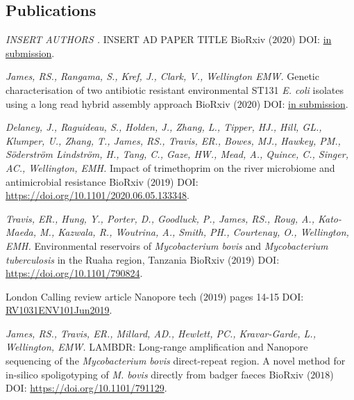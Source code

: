 \documentclass[hidelinks]{james-cv} %
\begin{document}
\subsection{Publications}
\hspace{-22.4\parskip}\begin{reflist}
\ent
\textit{INSERT AUTHORS . } {INSERT AD PAPER TITLE} {BioRxiv \color{gray}($2020$) \bodyfontsc DOI: \thinfont\color{blue}\href{https://www.biorxiv.org/}{in submission}.}

\ent
\textit{James, RS., Rangama, S., Kref, J., Clark, V., Wellington EMW. } {Genetic characterisation of two antibiotic resistant environmental ST131 \textit {E. coli} \textrm isolates using a long read hybrid assembly approach } {BioRxiv \color{gray}($2020$) \bodyfontsc DOI: \thinfont\color{blue}\href{https://www.biorxiv.org/}{in submission}.}

\ent
\textit{Delaney, J., Raguideau, S., Holden, J., Zhang, L., Tipper, HJ., Hill, GL., Klumper, U., Zhang, T., James, RS., Travis, ER., Bowes, MJ., Hawkey, PM., Söderström Lindström, H., Tang, C., Gaze, HW., Mead, A., Quince, C., Singer, AC., Wellington, EMH. } {Impact of trimethoprim on the river microbiome and antimicrobial resistance } {BioRxiv \color{gray}($2019$) \bodyfontsc DOI: \thinfont\color{blue}\href{https://www.biorxiv.org/content/10.1101/2020.06.05.133348v1}{https://doi.org/10.1101/2020.06.05.133348}.}

\ent
\textit{Travis, ER., Hung, Y., Porter, D., Goodluck, P., James, RS., Roug, A., Kato-Maeda, M., Kazwala, R., Woutrina, A., Smith, PH., Courtenay, O., Wellington, EMH. } {Environmental reservoirs of \textit {Mycobacterium bovis} \textrm and \textit {Mycobacterium tuberculosis} \textrm in the Ruaha region, Tanzania } {BioRxiv \color{gray}($2019$) \bodyfontsc DOI: \thinfont\color{blue}\href{https://www.biorxiv.org/content/10.1101/791129v2}{https://doi.org/10.1101/790824}.}

\ent
{}
{London Calling review article } {Nanopore tech \color{gray}($2019$) pages 14-15 \bodyfontsc DOI: \thinfont\color{blue}\href{https://nanoporetech.com/resource-centre/london-calling-review}{RV1031ENV101Jun2019}.}

\ent
\textit{James, RS., Travis, ER., Millard, AD., Hewlett, PC., Kravar-Garde, L., Wellington, EMW. } {LAMBDR: Long-range amplification and Nanopore sequencing of the \textit{Mycobacterium bovis} \textrm direct-repeat region. A novel method for in-silico spoligotyping of \textit {M. bovis} \textrm directly from badger faeces } {BioRxiv \color{gray}($2018$) \bodyfontsc DOI: \thinfont\color{blue}\href{https://www.biorxiv.org/content/10.1101/790824v1}{https://doi.org/10.1101/791129}.}


\end{reflist}
\end{document}
